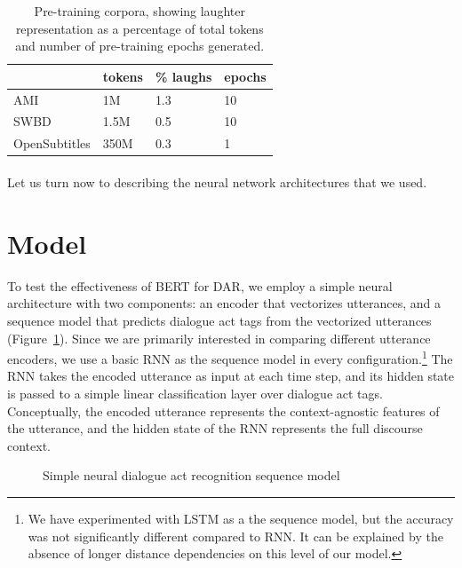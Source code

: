 \documentclass[11pt,a4paper]{article}
\begin{document}
\begin{table}[ht]
\centering
\begin{tabular}{@{}llll@{}}
\toprule
       & tokens & \% laughs & epochs\\ \midrule
AMI           & 1M     & 1.3             & 10     \\
SWBD          & 1.5M   & 0.5             & 10     \\
OpenSubtitles & 350M   & 0.3             & 1      \\ \bottomrule
\end{tabular}
\caption{Pre-training corpora, showing laughter representation as a percentage of total tokens and number of pre-training epochs generated.}\label{tab:pretraining-corpora}
\end{table}

\paragraph{}
Let us turn now to describing the neural network architectures that we used.
  
\section{Model} %

To test the effectiveness of BERT for DAR, we employ a simple neural architecture with two components: an encoder that vectorizes utterances, and a sequence model that predicts dialogue act tags from the vectorized utterances (Figure~\ref{fig:model-architecture}).
Since we are primarily interested in comparing different utterance encoders, we use a basic RNN as the sequence model in every configuration.\footnote{We have experimented with LSTM as a the sequence model, but the accuracy was not significantly different compared to RNN. It can be explained by the absence of longer distance dependencies on this level of our model.} 
The RNN takes the encoded utterance as input at each time step,
and its hidden state is passed to a simple linear classification layer over dialogue act tags.
Conceptually, the encoded utterance represents the context-agnostic features of the utterance, and the hidden state of the RNN represents the full discourse context.

\begin{figure}
  
  \caption{Simple neural dialogue act recognition sequence model}
  \label{fig:model-architecture}
\end{figure}
\end{document}

